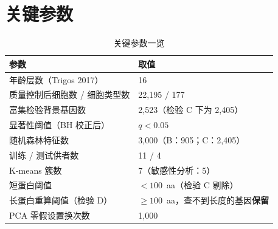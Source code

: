 \documentclass[UTF8, a4paper, 11pt]{ctexart}
\begin{document}
\section{关键参数}

\begin{table}[H]
  \centering
  \caption{关键参数一览}
  \label{tab:params}
  \small
  \begin{tabularx}{\textwidth}{@{}lX@{}}
    \toprule
    参数 & 取值 \\
    \midrule
    年龄层数（Trigos 2017） & 16 \\
    质量控制后细胞数 / 细胞类型数 & 22,195 / 177 \\
    富集检验背景基因数 & 2,523（检验 C 下为 2,405） \\
    显著性阈值（BH 校正后） & $q < 0.05$ \\
    随机森林特征数 & 3,000（B：905；C：2,405） \\
    训练 / 测试供者数 & 11 / 4 \\
    K-means 簇数 & 7（敏感性分析：5） \\
    短蛋白阈值 & $< 100$~aa（检验 C 剔除） \\
    长蛋白重算阈值（检验 D） & $\ge 100$~aa，查不到长度的基因\textbf{保留} \\
    PCA 零假设置换次数 & 1,000 \\
    \bottomrule
  \end{tabularx}
\end{table}
\end{document}
